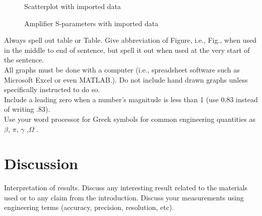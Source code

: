 \documentclass[journal]{IEEEtran}
\begin{document}
\begin{figure}[H]
\caption{Scatterplot with imported data}
\label{plot:scatter}
\end{figure}

\begin{figure}[H]
	\caption{Amplifier S-parameters with imported data}
	\label{plot:graph}
\end{figure}

 Always spell out table or Table. Give abbreviation of Figure, i.e., Fig., when used in
the middle to end of sentence, but spell it out when used at the very start of the
sentence. \\

All graphs must be done with a computer (i.e., spreadsheet software such as
Microsoft Excel or even MATLAB.). Do not include hand drawn graphs unless
specifically instructed to do so.  \\
Include a leading zero when a number’s magnitude is less than 1 (use 0.83 instead of
writing .83). \\
Use your word processor for Greek symbols for common engineering quantities as $\beta$, $\pi$, $\gamma$ ,$\Omega$ . 

\section{Discussion}
Interpretation of results. Discuss any interesting result related to the materials used or to any claim from the introduction. Discuss your measurements using engineering terms (accuracy, precision, resolution, etc).  
\end{document}
